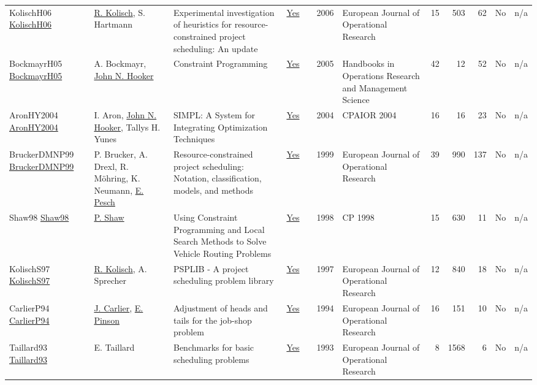 {\begin{longtable}{>{\raggedright\arraybackslash}p{3cm}>{\raggedright\arraybackslash}p{6cm}>{\raggedright\arraybackslash}p{6.5cm}rrrp{2.5cm}rrrrr}
KolischH06 \href{http://dx.doi.org/10.1016/j.ejor.2005.01.065}{KolischH06} & \hyperref[auth:a447]{R. Kolisch}, S. Hartmann & Experimental investigation of heuristics for resource-constrained project scheduling: An update & \href{works/KolischH06.pdf}{Yes} & \cite{KolischH06} & 2006 & European Journal of Operational Research & 15 & 503 & 62 & No & n/a\\
BockmayrH05 \href{http://dx.doi.org/10.1016/s0927-0507(05)12010-6}{BockmayrH05} & A. Bockmayr, \hyperref[auth:a162]{John N. Hooker} & Constraint Programming & \href{works/BockmayrH05.pdf}{Yes} & \cite{BockmayrH05} & 2005 & Handbooks in Operations Research and Management Science & 42 & 12 & 52 & No & n/a\\
AronHY2004 \href{http://dx.doi.org/10.1007/978-3-540-24664-0_2}{AronHY2004} & I. Aron, \hyperref[auth:a162]{John N. Hooker}, Tallys H. Yunes & SIMPL: A System for Integrating Optimization Techniques & \href{works/AronHY2004.pdf}{Yes} & \cite{AronHY2004} & 2004 & CPAIOR 2004 & 16 & 16 & 23 & No & n/a\\
BruckerDMNP99 \href{http://dx.doi.org/10.1016/s0377-2217(98)00204-5}{BruckerDMNP99} & P. Brucker, A. Drexl, R. M\"{o}hring, K. Neumann, \hyperref[auth:a445]{E. Pesch} & Resource-constrained project scheduling: Notation,  classification,  models,  and methods & \href{works/BruckerDMNP99.pdf}{Yes} & \cite{BruckerDMNP99} & 1999 & European Journal of Operational Research & 39 & 990 & 137 & No & n/a\\
Shaw98 \href{https://doi.org/10.1007/3-540-49481-2\_30}{Shaw98} & \hyperref[auth:a120]{P. Shaw} & Using Constraint Programming and Local Search Methods to Solve Vehicle Routing Problems & \href{works/Shaw98.pdf}{Yes} & \cite{Shaw98} & 1998 & CP 1998 & 15 & 630 & 11 & No & n/a\\
KolischS97 \href{http://dx.doi.org/10.1016/s0377-2217(96)00170-1}{KolischS97} & \hyperref[auth:a447]{R. Kolisch}, A. Sprecher & PSPLIB - A project scheduling problem library & \href{works/KolischS97.pdf}{Yes} & \cite{KolischS97} & 1997 & European Journal of Operational Research & 12 & 840 & 18 & No & n/a\\
CarlierP94 \href{http://dx.doi.org/10.1016/0377-2217(94)90379-4}{CarlierP94} & \hyperref[auth:a858]{J. Carlier}, \hyperref[auth:a859]{E. Pinson} & Adjustment of heads and tails for the job-shop problem & \href{works/CarlierP94.pdf}{Yes} & \cite{CarlierP94} & 1994 & European Journal of Operational Research & 16 & 151 & 10 & No & n/a\\
Taillard93 \href{http://dx.doi.org/10.1016/0377-2217(93)90182-m}{Taillard93} & E. Taillard & Benchmarks for basic scheduling problems & \href{works/Taillard93.pdf}{Yes} & \cite{Taillard93} & 1993 & European Journal of Operational Research & 8 & 1568 & 6 & No & n/a\\

\end{longtable}}

